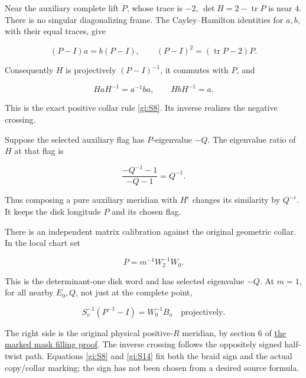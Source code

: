 Near the auxiliary complete lift \(P\), whose trace is \(-2\),
\(\det H=2-\operatorname{tr}P\) is near \(4\).
There is no singular diagonalizing frame.
The Cayley--Hamilton identities for \(a,b\), with their equal
traces, give

\begin{equation}\label{gi:S10}
(P-I)a=b(P-I),\qquad
 (P-I)^2=(\operatorname{tr}P-2)P.
\end{equation}

Consequently \(H\) is projectively \((P-I)^{-1}\), it
commutes with \(P\), and

\begin{equation}\label{gi:S11}
HaH^{-1}=a^{-1}ba,\qquad HbH^{-1}=a.
\end{equation}

This is the exact positive collar rule \eqref{gi:S8}. Its inverse realizes
the negative crossing.

Suppose the selected auxiliary flag has \(P\)-eigenvalue
\(-Q\). The eigenvalue ratio of \(H\) at that flag is

\begin{equation}\label{gi:S12}
\frac{-Q^{-1}-1}{-Q-1}=Q^{-1}.
\end{equation}

Thus composing a pure auxiliary meridian with \(H^\epsilon\)
changes its similarity by \(Q^{-\epsilon}\). It keeps the
disk longitude \(P\) and its chosen flag.

There is an independent matrix calibration against the original
geometric collar. In the local chart set

\begin{equation}\label{gi:S13}
P=m^{-1}W_2^{-1}W_0.
\end{equation}

This is the determinant-one disk word and has selected
eigenvalue \(-Q\). At \(m=1\), for all nearby \(E_0,Q\),
not just at the complete point,

\begin{equation}\label{gi:S14}
S_v^{-1}(P^{-1}-I)=W_0^{-1}B_{\mathrm o}
                        \quad\text{projectively}.
\end{equation}

The right side is the original physical positive-\(R\)
meridian, by section 6 of
\href{https://sashakolpakov.github.io/murakamis_dream/notes/actual_conway_general_mask_marked_filling.html}{the marked mask filling proof}.
The inverse crossing follows the oppositely signed half-twist path.
Equations \eqref{gi:S8} and \eqref{gi:S14} fix both the braid sign and the actual
copy/collar marking; the sign has not been chosen from a desired
source formula.

